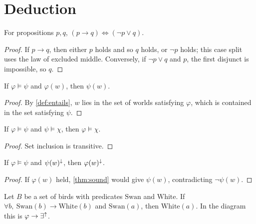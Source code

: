 \section{Deduction}\label{sec:deduction}

\begin{proposition}\label{prop:imp}
For propositions $p,q$, $(p\to q)\iff(\neg p\vee q)$.
\end{proposition}

\begin{proof}
If $p\to q$, then either $p$ holds and so $q$ holds, or $\neg p$ holds; this case split uses the
law of excluded middle. Conversely, if $\neg p\vee q$ and $p$, the first disjunct is impossible,
so $q$.
\end{proof}

\begin{theorem}\label{thm:sound}
If $\varphi\models\psi$ and $\varphi(w)$, then $\psi(w)$.
\end{theorem}

\begin{proof}
By \cref{def:entails}, $w$ lies in the set of worlds satisfying $\varphi$, which is contained in
the set satisfying $\psi$.
\end{proof}

\begin{proposition}
If $\varphi\models\psi$ and $\psi\models\chi$, then $\varphi\models\chi$.
\end{proposition}

\begin{proof}
Set inclusion is transitive.
\end{proof}

\begin{proposition}\label{prop:tollens}
If $\varphi\models\psi$ and $\psi(w)^{{\downarrow}}$, then $\varphi(w)^{{\downarrow}}$.
\end{proposition}

\begin{proof}
If $\varphi(w)$ held, \cref{thm:sound} would give $\psi(w)$, contradicting $\neg\psi(w)$.
\end{proof}

\begin{example}
Let $B$ be a set of birds with predicates $\mathrm{Swan}$ and $\mathrm{White}$. If
$\forall b,\ \mathrm{Swan}(b)\to\mathrm{White}(b)$ and $\mathrm{Swan}(a)$, then
$\mathrm{White}(a)$. In the diagram this is $\varphi\to\exists^{{\uparrow}}$.
\end{example}
